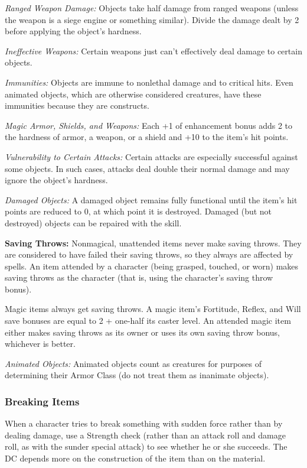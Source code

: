 \textit{Ranged Weapon Damage:} Objects take half damage from ranged weapons (unless 
the weapon is a siege engine or something similar). Divide the damage dealt by 
2 before applying the object's hardness.

\textit{Ineffective Weapons:} Certain weapons just can't effectively deal damage 
to certain objects.

\textit{Immunities:} Objects are immune to nonlethal damage and to critical hits.
Even animated objects, which are otherwise considered creatures, have these immunities 
because they are constructs.

\textit{Magic Armor, Shields, and Weapons:} Each +1 of enhancement bonus adds 2 
to the hardness of armor, a weapon, or a shield and +10 to the item's hit points.

\textit{Vulnerability to Certain Attacks:} Certain attacks are especially successful 
against some objects. In such cases, attacks deal double their normal damage and 
may ignore the object's hardness.

\textit{Damaged Objects:} A damaged object remains fully functional until the item's 
hit points are reduced to 0, at which point it is destroyed.
Damaged (but not destroyed) objects can be repaired with the  skill.

\textbf{Saving Throws:} Nonmagical, unattended items never make saving throws. 
They are considered to have failed their saving throws, so they always are affected 
by spells. An item attended by a character (being grasped, touched, or worn) makes 
saving throws as the character (that is, using the character's saving throw bonus).

Magic items always get saving throws. A magic item's Fortitude, Reflex, and Will 
save bonuses are equal to 2 + one-half its caster level. An attended magic item 
either makes saving throws as its owner or uses its own saving throw bonus, whichever 
is better.

\textit{Animated Objects:} Animated objects count as creatures for purposes of 
determining their Armor Class (do not treat them as inanimate objects).

\subsubsection{Breaking Items}

When a character tries to break something with sudden force rather than by dealing 
damage, use a Strength check (rather than an attack roll and damage roll, as with 
the sunder special attack) to see whether he or she succeeds. The DC depends more 
on the construction of the item than on the material.

